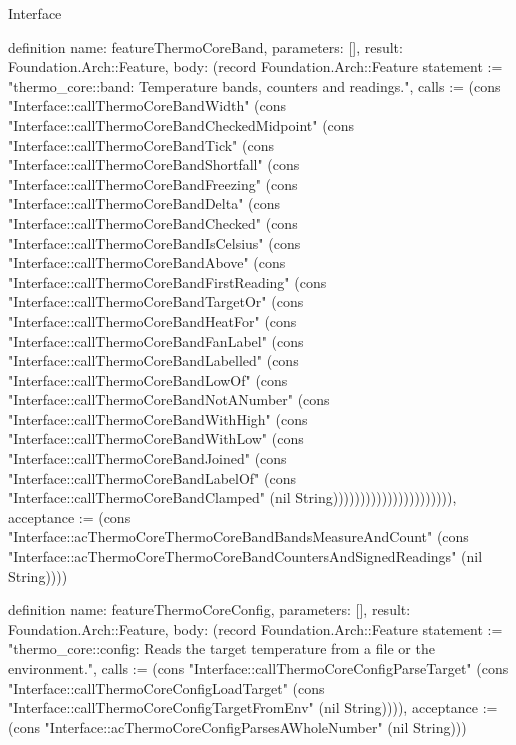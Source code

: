 \begin{lexlean}{Interface}
\begin{semanticmodule}
definition{
  name: featureThermoCoreBand,
  parameters: [],
  result: Foundation.Arch::Feature,
  body: (record Foundation.Arch::Feature {statement := "thermo_core::band: Temperature bands, counters and readings.", calls := (cons "Interface::callThermoCoreBandWidth" (cons "Interface::callThermoCoreBandCheckedMidpoint" (cons "Interface::callThermoCoreBandTick" (cons "Interface::callThermoCoreBandShortfall" (cons "Interface::callThermoCoreBandFreezing" (cons "Interface::callThermoCoreBandDelta" (cons "Interface::callThermoCoreBandChecked" (cons "Interface::callThermoCoreBandIsCelsius" (cons "Interface::callThermoCoreBandAbove" (cons "Interface::callThermoCoreBandFirstReading" (cons "Interface::callThermoCoreBandTargetOr" (cons "Interface::callThermoCoreBandHeatFor" (cons "Interface::callThermoCoreBandFanLabel" (cons "Interface::callThermoCoreBandLabelled" (cons "Interface::callThermoCoreBandLowOf" (cons "Interface::callThermoCoreBandNotANumber" (cons "Interface::callThermoCoreBandWithHigh" (cons "Interface::callThermoCoreBandWithLow" (cons "Interface::callThermoCoreBandJoined" (cons "Interface::callThermoCoreBandLabelOf" (cons "Interface::callThermoCoreBandClamped" (nil String)))))))))))))))))))))), acceptance := (cons "Interface::acThermoCoreThermoCoreBandBandsMeasureAndCount" (cons "Interface::acThermoCoreThermoCoreBandCountersAndSignedReadings" (nil String)))})
}

definition{
  name: featureThermoCoreConfig,
  parameters: [],
  result: Foundation.Arch::Feature,
  body: (record Foundation.Arch::Feature {statement := "thermo_core::config: Reads the target temperature from a file or the environment.", calls := (cons "Interface::callThermoCoreConfigParseTarget" (cons "Interface::callThermoCoreConfigLoadTarget" (cons "Interface::callThermoCoreConfigTargetFromEnv" (nil String)))), acceptance := (cons "Interface::acThermoCoreConfigParsesAWholeNumber" (nil String))})
}


\end{semanticmodule}
\end{lexlean}
